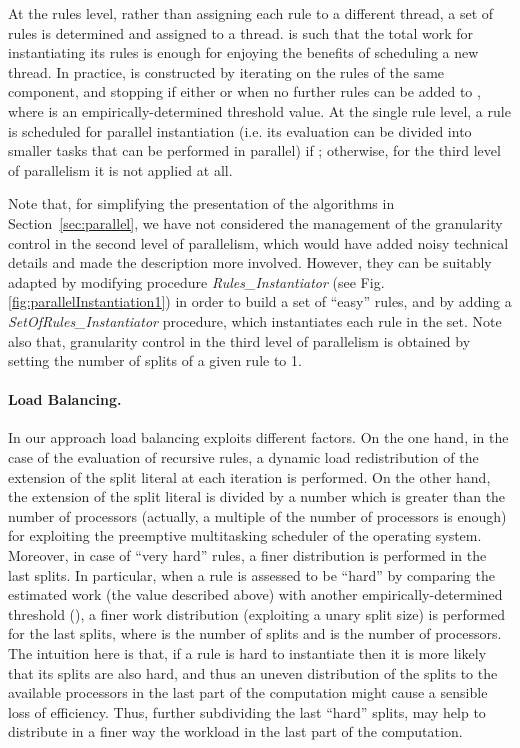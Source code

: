 \documentclass[preprint]{tlp}
\begin{document}
At the rules level, rather than assigning each rule to a different thread, a set of rules  is determined and assigned to a thread.
 is such that the total work for instantiating its rules
is enough for enjoying the benefits of scheduling a new thread.
In practice,  is constructed by iterating on the rules of the same component, and
stopping if either  or when no further rules can be added to ,
where  is an empirically-determined threshold value.
At the single rule level, a rule  is scheduled for parallel instantiation (i.e.
its evaluation can be divided into smaller tasks that can be performed in parallel)
if ; otherwise, for  the third level of parallelism it is not applied at all.

Note that, for simplifying the presentation of the algorithms in Section~\ref{sec:parallel},
we have not considered the management of the granularity control in the second level of parallelism,
which would have added noisy technical details and made the description more involved.
However, they can be suitably adapted by modifying procedure {\em Rules\_Instantiator} (see Fig.\ref{fig:parallelInstantiation1})
in order to build a set of ``easy'' rules, and by adding a {\em SetOfRules\_Instantiator} procedure, which instantiates each rule in the set.
Note also that, granularity control in the third level of parallelism is obtained by setting the number of splits of a given rule to 1.

\paragraph{Load Balancing.} In our approach load balancing exploits different factors.
On the one hand, in the case of the evaluation of recursive rules, a dynamic load redistribution
of the extension of the split literal at each iteration is performed.
On the other hand, the extension of the split literal is divided by a number which
is greater than the number of processors (actually, a multiple of the number of processors is enough)
for exploiting the preemptive multitasking scheduler of the operating system.
Moreover, in case of ``very hard'' rules, a finer distribution is performed in the last splits.
 In particular, when a rule is assessed to be ``hard''
by comparing the estimated work (the value  described above) with another empirically-determined threshold (),
a finer work distribution (exploiting a unary split size) is performed for the last  splits,
where  is the number of splits and  is the number of processors.
The intuition here is that, if a rule is hard to instantiate then
it is more likely that its splits are also hard, and thus
an uneven distribution of the splits to the available processors
in the last part of the computation might cause a sensible loss of efficiency.
Thus, further subdividing the last ``hard'' splits, may help to distribute in a finer way
the workload in the last part of the computation.
\end{document}
